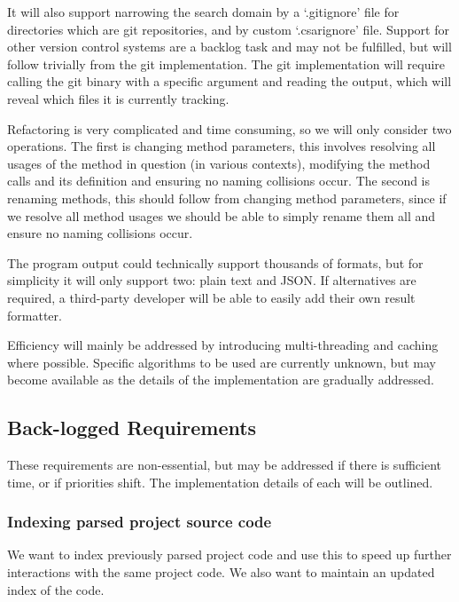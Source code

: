 \documentclass[12pt, letterpaper, oneside]{article}
\begin{document}
It will also support narrowing the search domain by a `.gitignore' file for directories which are git repositories, and by custom `.csarignore' file. Support for other version control systems are a backlog task and may not be fulfilled, but will follow trivially from the git implementation.
The git implementation will require calling the git binary with a specific argument and reading the output, which will reveal which files it is currently tracking.

Refactoring is very complicated and time consuming, so we will only consider two operations.
The first is changing method parameters, this involves resolving all usages of the method in question (in various contexts), modifying the method calls and its definition and ensuring no naming collisions occur.
The second is renaming methods, this should follow from changing method parameters, since if we resolve all method usages we should be able to simply rename them all and ensure no naming collisions occur.

The program output could technically support thousands of formats, but for simplicity it will only support two: plain text and JSON.
If alternatives are required, a third-party developer will be able to easily add their own result formatter.

Efficiency will mainly be addressed by introducing multi-threading and caching where possible.
Specific algorithms to be used are currently unknown, but may become available as the details of the implementation are gradually addressed.

\subsection{Back-logged Requirements}
These requirements are non-essential, but may be addressed if there is sufficient time, or if priorities shift.
The implementation details of each will be outlined.

\subsubsection{Indexing parsed project source code}
We want to index previously parsed project code and use this to speed up further interactions with the same project code.
We also want to maintain an updated index of the code.
\end{document}
